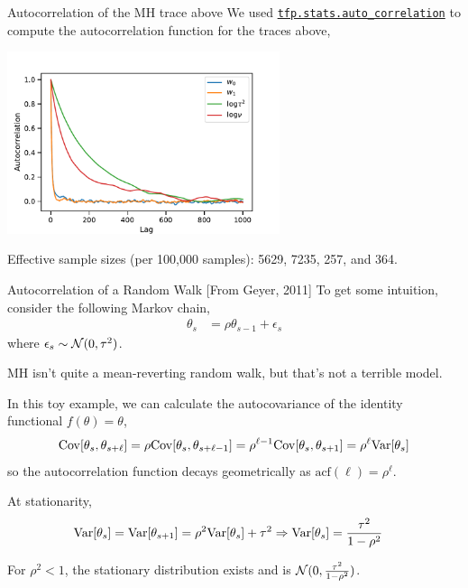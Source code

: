 \documentclass[aspectratio=169]{beamer}
\begin{document}
\begin{frame}{Autocorrelation of the MH trace above}
    We used \href{https://www.tensorflow.org/probability/api_docs/python/tfp/stats/auto_correlation}{\texttt{tfp.stats.auto\_correlation}} to compute the autocorrelation function for the traces above,
    \begin{center}
         \includegraphics[width=0.6\textwidth]{figures/lap3/mh_autocorr.pdf}
    \end{center}
    Effective sample sizes (per 100,000 samples): 5629, 7235,  257, and 364.
\end{frame}

\begin{frame}{Autocorrelation of a Random Walk}
[From Geyer, 2011] To get some intuition, consider the following Markov chain,
\begin{align}
    \theta_s &= \rho \theta_{s-1} + \epsilon_s 
\end{align}
where $\epsilon_s \sim \mathcal{N}(0, \tau^2)$.

MH isn't quite a mean-reverting random walk, but that's not a terrible model. 

In this toy example, we can calculate the autocovariance of the identity functional $f(\theta) = \theta$,
\begin{align}
    \mathrm{Cov}[\theta_s, \theta_{s+\ell}] = 
    \rho \mathrm{Cov}[\theta_s, \theta_{s+\ell - 1}] = 
    \rho^{\ell - 1} \mathrm{Cov}[\theta_s, \theta_{s+1}] = 
    \rho^\ell \textrm{Var}[\theta_s]
\end{align}
so the autocorrelation function decays geometrically as $\mathrm{acf}(\ell) = \rho^\ell$.

At stationarity,
\begin{align}
    \textrm{Var}[\theta_s] &= \textrm{Var}[\theta_{s+1}] = \rho^2 \textrm{Var}[\theta_s] + \tau^2
    \Rightarrow \textrm{Var}[\theta_s] = \frac{\tau^2}{1 - \rho^2}
\end{align}

For $\rho^2 < 1$, the stationary distribution exists and is $\mathcal{N}(0, \tfrac{\tau^2}{1-\rho^2})$.

\end{frame}
\end{document}
